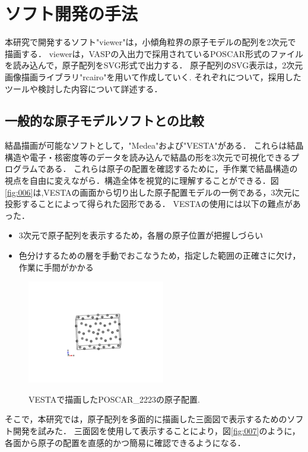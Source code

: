 
\section{ソフト開発の手法}
本研究で開発するソフト"viewer"は，小傾角粒界の原子モデルの配列を2次元で描画する．
viewerは，VASPの入出力で採用されているPOSCAR形式のファイルを読み込んで，原子配列をSVG形式で出力する．
原子配列のSVG表示は，2次元画像描画ライブラリ"rcairo"を用いて作成していく.
それぞれについて，採用したツールや検討した内容について詳述する．

\subsection{一般的な原子モデルソフトとの比較}
結晶描画が可能なソフトとして，"Medea"および"VESTA"がある．
これらは結晶構造や電子・核密度等のデータを読み込んで結晶の形を3次元で可視化できるプログラムである\cite{Vesta}．
これらは原子の配置を確認するために，手作業で結晶構造の視点を自由に変えながら．構造全体を視覚的に理解することができる．図\ref{fig:006}は,VESTAの画面から切り出した原子配置モデルの一例である，3次元に投影することによって得られた図形である．
VESTAの使用には以下の難点があった．

\begin{itemize}
\item 3次元で原子配列を表示するため，各層の原子位置が把握しづらい
\item 色分けするための層を手動でおこなうため，指定した範囲の正確さに欠け，作業に手間がかかる
\end{itemize}
\begin{figure}[htbp]\begin{center}
\includegraphics[width=6cm,bb= 0 0 937 753]{../figs/./boundary_narita.006.jpeg}
\caption{VESTAで描画したPOSCAR\_2223の原子配置.}
\label{fig:006}
\label{default}\end{center}\end{figure}
そこで，本研究では，原子配列を多面的に描画した三面図で表示するためのソフト開発を試みた．
三面図を使用して表示することにより，図\ref{fig:007}のように，各面から原子の配置を直感的かつ簡易に確認できるようになる．

